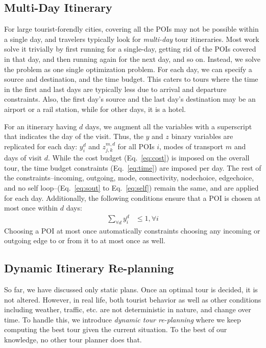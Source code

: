 \subsection{Multi-Day Itinerary}

For large tourist-forendly cities, covering all the POIs may not be
possible within a single day, and travelers typically look for
\emph{multi-day} tour itineraries.  Most work solve it trivially by first
running for a single-day, getting rid of the POIs covered in that day, and
then running again for the next day, and so on.  Instead, we solve the
problem as one single optimization problem.  For each day, we can specify a
source and destination, and the time budget.  This caters to tours where
the time in the first and last days are typically less due to arrival and
departure constraints.  Also, the first day's source and the last day's
destination may be an airport or a rail station, while for other days, it
is a hotel.

For an itinerary having $d$ days, we augment all the variables with a
superscript that indicates the day of the visit.  Thus, the $y$ and $z$
binary variables are replicated for each day: $y^d_i$ and $z^{m,d}_{j,k}$
for all POIs $i$, modes of transport $m$ and days of visit $d$.  While the
cost budget (Eq.~\eqref{eq:cost}) is imposed on the overall tour, the time
budget constraints (Eq.~\eqref{eq:time}) are imposed per day.  The rest of
the constraints--incoming, outgoing, mode, connectivity, nodechoice,
edgechoice, and no self loop--(Eq.~\eqref{eq:sout} to Eq.~\eqref{eq:self})
remain the same, and are applied for each day.  Additionally, the following
conditions ensure that a POI is chosen at most once within $d$ days:
%
\begin{align}
	\label{eq:multiday}
	\sum_{\forall d} y^d_i & \leq 1, \forall i
\end{align}
%
Choosing a POI at most once automatically constraints choosing any incoming
or outgoing edge to or from it to at most once as well.

\subsection{Dynamic Itinerary Re-planning}

So far, we have discussed only static plans.
Once an optimal tour is decided, it is not altered.
However, in real life, both tourist behavior as well as other conditions including weather, traffic, etc. are not deterministic in nature, and change over time.
To handle this, we introduce \emph{dynamic tour re-planning} where we keep computing the best tour given the current situation.
To the best of our knowledge, no other tour planner does that.

